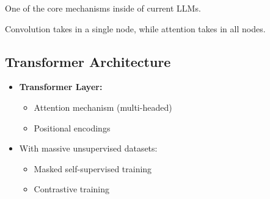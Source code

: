 \begin{motivation}
    One of the core mechanisms inside of current LLMs. 
\end{motivation}

\begin{warning}
    Convolution takes in a single node, while attention takes in all nodes. 
\end{warning}

\subsection{Transformer Architecture}
\begin{notes}
    \begin{itemize}
        \item \textbf{Transformer Layer:} 
        \begin{itemize}
            \item Attention mechanism (multi-headed)
            \item Positional encodings
        \end{itemize}
        \item With massive unsupervised datasets: 
        \begin{itemize}
            \item Masked self-supervised training
            \item Contrastive training
        \end{itemize}
    \end{itemize}
\end{notes}
\newpage

